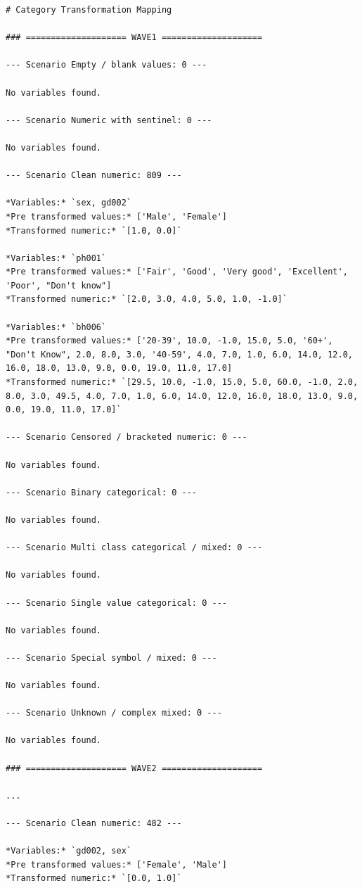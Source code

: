 \begin{verbatim}
# Category Transformation Mapping

### ==================== WAVE1 ====================

--- Scenario Empty / blank values: 0 ---

No variables found.

--- Scenario Numeric with sentinel: 0 ---

No variables found.

--- Scenario Clean numeric: 809 ---

*Variables:* `sex, gd002`  
*Pre transformed values:* ['Male', 'Female']  
*Transformed numeric:* `[1.0, 0.0]`

*Variables:* `ph001`  
*Pre transformed values:* ['Fair', 'Good', 'Very good', 'Excellent', 'Poor', "Don't know"]  
*Transformed numeric:* `[2.0, 3.0, 4.0, 5.0, 1.0, -1.0]`

*Variables:* `bh006`  
*Pre transformed values:* ['20-39', 10.0, -1.0, 15.0, 5.0, '60+', "Don't Know", 2.0, 8.0, 3.0, '40-59', 4.0, 7.0, 1.0, 6.0, 14.0, 12.0, 16.0, 18.0, 13.0, 9.0, 0.0, 19.0, 11.0, 17.0]  
*Transformed numeric:* `[29.5, 10.0, -1.0, 15.0, 5.0, 60.0, -1.0, 2.0, 8.0, 3.0, 49.5, 4.0, 7.0, 1.0, 6.0, 14.0, 12.0, 16.0, 18.0, 13.0, 9.0, 0.0, 19.0, 11.0, 17.0]`

--- Scenario Censored / bracketed numeric: 0 ---

No variables found.

--- Scenario Binary categorical: 0 ---

No variables found.

--- Scenario Multi class categorical / mixed: 0 ---

No variables found.

--- Scenario Single value categorical: 0 ---

No variables found.

--- Scenario Special symbol / mixed: 0 ---

No variables found.

--- Scenario Unknown / complex mixed: 0 ---

No variables found.

### ==================== WAVE2 ====================

...

--- Scenario Clean numeric: 482 ---

*Variables:* `gd002, sex`
*Pre transformed values:* ['Female', 'Male']  
*Transformed numeric:* `[0.0, 1.0]`


\end{verbatim}
